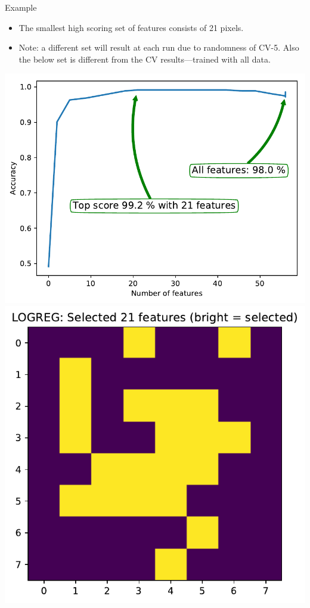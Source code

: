 \documentclass[10pt, aspectratio=169]{beamer} %
\begin{document}
\begin{frame}{Example}
\begin{itemize}
\item The smallest high scoring set of features consists of 21 pixels.
\item Note: a different set will result at each run due to randomness of CV-5. Also the below set is different from the CV results---trained with all data.
\end{itemize}
\begin{center}
	\includegraphics[height=0.4\textheight]{L1_digits_accuracy.pdf}
\qquad
\includegraphics[height=0.4\textheight]{L1_digits_mask.pdf}
\end{center}
\end{frame}
\end{document}
